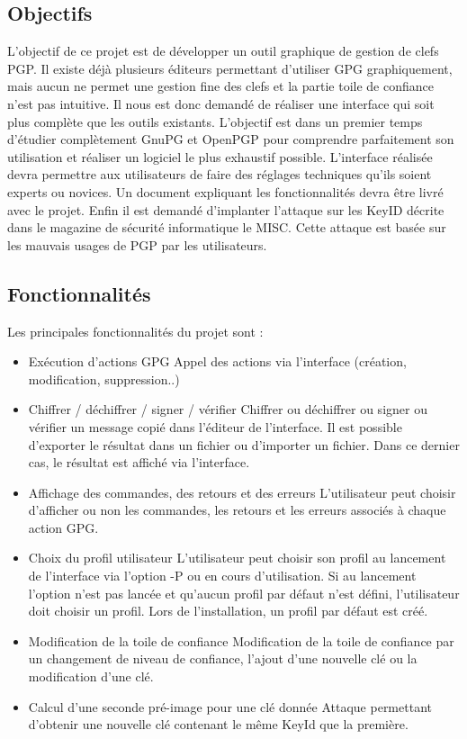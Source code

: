 \documentclass{../res/univ-projet}
\begin{document}
  \subsection{Objectifs}
  L'objectif de ce projet est de développer un outil graphique de gestion de clefs PGP. Il existe déjà plusieurs éditeurs permettant d'utiliser GPG graphiquement, mais aucun ne permet une gestion fine des clefs et la partie toile de confiance n'est pas intuitive. Il nous est donc demandé de réaliser une interface qui soit plus complète que les outils existants. L'objectif est dans un premier temps d'étudier complètement GnuPG et OpenPGP pour comprendre parfaitement son utilisation et réaliser un logiciel le plus exhaustif possible. L'interface réalisée devra permettre aux utilisateurs de faire des réglages techniques qu'ils soient experts ou novices. Un document expliquant les fonctionnalités devra être livré avec le projet.
  Enfin il est demandé d'implanter l'attaque sur les KeyID décrite dans le magazine de sécurité informatique le MISC. Cette attaque est basée sur les mauvais usages de PGP par les utilisateurs.
  
  \newpage
  
  \subsection{Fonctionnalités}
  
  Les principales fonctionnalités du projet sont : \medbreak
  \begin{itemize}
  \item Exécution d'actions GPG \smallbreak
  Appel des actions via l'interface (création, modification, suppression..) \smallbreak
  \item Chiffrer / déchiffrer / signer / vérifier \smallbreak
  Chiffrer ou déchiffrer ou signer ou vérifier un message copié dans l'éditeur de l'interface. Il est possible d'exporter le résultat dans un fichier ou d'importer un fichier. Dans ce dernier cas, le résultat est affiché via l'interface. \smallbreak
  \item Affichage des commandes, des retours et des erreurs \smallbreak
  L'utilisateur peut choisir d'afficher ou non les commandes, les retours et les erreurs associés à chaque action GPG. \smallbreak 
  \item Choix du profil utilisateur \smallbreak
  L'utilisateur peut choisir son profil au lancement de l'interface via l'option -P ou en cours d'utilisation. Si au lancement l'option n'est pas lancée et qu'aucun profil par défaut n'est défini, l'utilisateur doit choisir un profil. Lors de l'installation, un profil par défaut est créé. \smallbreak
  \item Modification de la toile de confiance \smallbreak
  Modification de la toile de confiance par un changement de niveau de confiance, l'ajout d'une nouvelle clé ou la modification d'une clé. \smallbreak
  \item Calcul d'une seconde pré-image pour une clé donnée \smallbreak
  Attaque permettant d'obtenir une nouvelle clé contenant le même KeyId que la première.
  \end{itemize}
  
\end{document}
